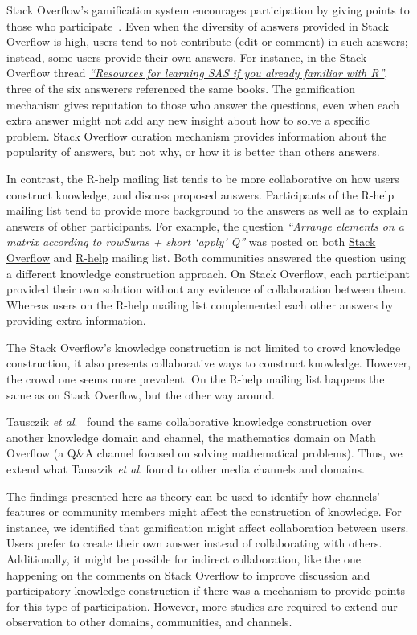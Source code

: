 \documentclass{sig-alternate-05-2015}
\begin{document}
	Stack Overflow's gamification system encourages participation by giving points to those who participate~\cite{Singer2013}.
	Even when the diversity of answers provided in Stack Overflow is high, users tend to not contribute (edit or comment) in such answers; instead, some users provide their own answers.
	For instance, in the Stack Overflow thread \textit{\href{http://goo.gl/Mb4Pbk}{``Resources for learning SAS if you already familiar with R''}}, three of the six answerers referenced the same books.
	The gamification mechanism gives reputation to those who answer the questions, even when each extra answer might not add any new insight about how to solve a specific problem.
	Stack Overflow curation mechanism provides information about the popularity of answers, but not why, or how it is better than others answers.

	In contrast, the R-help mailing list tends to be more collaborative on how users construct knowledge, and discuss proposed answers.
	Participants of the R-help mailing list tend to provide more background to the answers as well as to explain answers of other participants.
	For example, the question \textit{``Arrange elements on a matrix according to rowSums + short `apply' Q''} was posted on both \href{http://goo.gl/a8AES8}{Stack Overflow} and \href{http://goo.gl/PGflT5}{R-help} mailing list.
	Both communities answered the question using a different knowledge construction approach.
	On Stack Overflow, each participant provided their own solution without any evidence of collaboration between them.
	Whereas users on the R-help mailing list complemented each other answers by providing extra information.

	The Stack Overflow's knowledge construction is not limited to crowd knowledge construction, it also presents collaborative ways to construct knowledge.
	However, the crowd one seems more prevalent.
	On the R-help mailing list happens the same as on Stack Overflow, but the other way around.


	Tausczik \textit{et al}.~\cite{Tausczik2014} found the same collaborative knowledge construction over another knowledge domain and channel, the mathematics domain on Math Overflow (a Q\&A channel focused on solving mathematical problems).
	Thus, we extend what Tausczik \textit{et al}. found to other media channels and domains.

	The findings presented here as theory can be used to identify how channels' features or community members might affect the construction of knowledge.
	For instance, we identified that gamification might affect collaboration between users. 
	Users prefer to create their own answer instead of collaborating with others.
	Additionally, it might be possible for indirect collaboration, like the one happening on the comments on Stack Overflow to improve discussion and participatory knowledge construction if there was a mechanism to provide points for this type of participation.
	However, more studies are required to extend our observation to other domains, communities, and channels.
\end{document}

